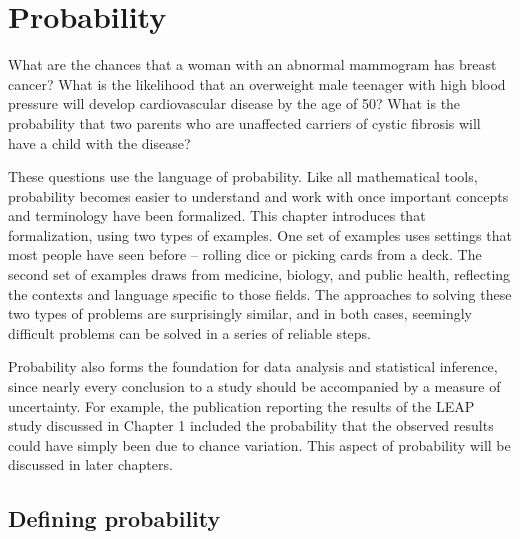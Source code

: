

\chapter{Probability}
\label{probability}





What are the chances that a woman with an abnormal mammogram has breast cancer?  What is the likelihood that an overweight male teenager with high blood pressure will develop cardiovascular disease by the age of 50?  What is the probability that two parents who are unaffected carriers of cystic fibrosis will have a child with the disease? 

These questions use the language of probability. Like all mathematical tools, probability becomes easier to understand and work with once important concepts and terminology have been formalized. This chapter introduces that formalization, using two types of examples. One set of examples uses settings that most people have seen before -- rolling dice or picking cards from a deck. The second set of examples draws from medicine, biology, and public health, reflecting the contexts and language specific to those fields. The approaches to solving these two types of problems are surprisingly similar, and in both cases, seemingly difficult problems can be solved in a series of reliable steps.

Probability also forms the foundation for data analysis and statistical inference, since nearly every conclusion to a study should be accompanied by a measure of uncertainty. For example, the publication reporting the results of the LEAP study discussed in Chapter 1 included the probability that the observed results could have simply been due to chance variation. This aspect of probability will be discussed in later chapters.

\section{Defining probability}
\label{basicsOfProbability}

